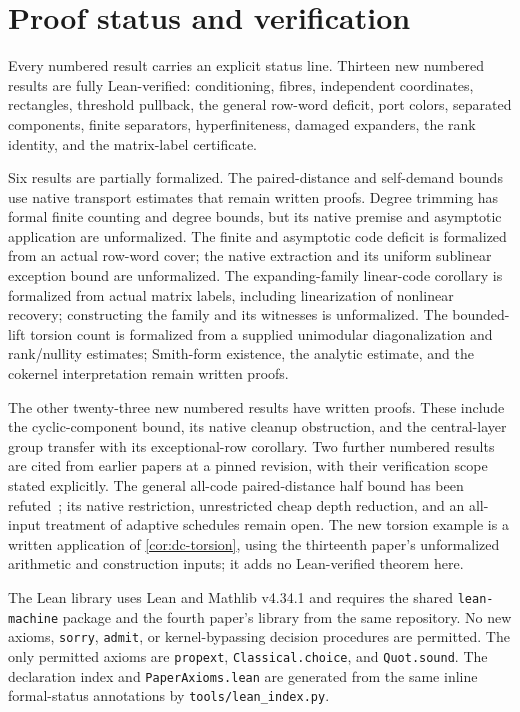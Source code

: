 \section{Proof status and verification}\label{sec:verification}

Every numbered result carries an explicit status line. Thirteen new numbered
results are fully Lean-verified: conditioning, fibres, independent coordinates,
rectangles, threshold pullback, the general row-word deficit, port colors, separated components, finite
separators, hyperfiniteness, damaged expanders, the rank identity, and the
matrix-label certificate.

Six results are partially formalized. The paired-distance and self-demand
bounds use native transport estimates that remain written proofs. Degree
trimming has formal finite counting and degree bounds, but its native premise
and asymptotic application are unformalized. The finite and asymptotic
code deficit is formalized from an actual row-word cover; the native extraction
and its uniform sublinear exception bound are unformalized. The expanding-family
linear-code corollary is formalized from actual matrix labels, including
linearization of nonlinear recovery; constructing the family and its witnesses
is unformalized. The bounded-lift torsion count is formalized from a supplied
unimodular diagonalization and rank/nullity estimates; Smith-form existence,
the analytic estimate, and the cokernel interpretation remain written proofs.

The other twenty-three new numbered results have written proofs. These include
the cyclic-component bound, its native cleanup obstruction, and the
central-layer group transfer with its exceptional-row corollary. Two further
numbered results are cited from earlier papers at a pinned revision, with their
verification scope stated explicitly. The general all-code paired-distance
half bound has been refuted~\cite{StorageCodes2026}; its native restriction,
unrestricted cheap depth reduction, and an all-input treatment of adaptive
schedules remain open. The new torsion example is a written application
of \cref{cor:dc-torsion}, using the thirteenth paper's unformalized arithmetic
and construction inputs; it adds no Lean-verified theorem here.

The Lean library uses Lean and Mathlib v4.34.1 and requires the shared
\texttt{lean-machine} package and the fourth paper's library from the same repository. No new axioms,
\texttt{sorry}, \texttt{admit}, or kernel-bypassing decision procedures are permitted.
The only permitted axioms are \texttt{propext}, \texttt{Classical.choice}, and
\texttt{Quot.sound}. The declaration index and \texttt{PaperAxioms.lean} are generated
from the same inline formal-status annotations by \texttt{tools/lean\_index.py}.

